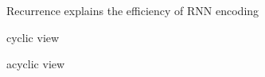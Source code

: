 \documentclass{beamer}
\begin{document}
  \begin{frame}{Recurrence explains the efficiency of RNN encoding}
    
    \newsavebox{\recurrent}
\newsavebox{\recurrentuf}

cyclic view
    \begin{center} \usebox{\recurrent} \end{center}

acyclic view
    \begin{center}  \usebox{\recurrentuf} \end{center}
    
  \end{frame}
\end{document}
